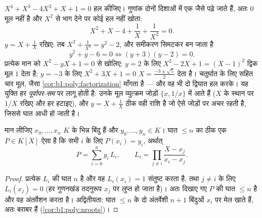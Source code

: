 \begin{example}[पूर्वापर-सम समीकरण]\label{ex:b1:poly:palindrome}
$X^4 + X^3 - 4X^2 + X + 1 = 0$ हल कीजिए। गुणांक दोनों दिशाओं में एक जैसे
पढ़े जाते हैं, अतः $0$ मूल नहीं है और $X^2$ से भाग देने पर कोई हल नहीं खोता:
\[
X^2 + X - 4 + \frac1X + \frac1{X^2} = 0 .
\]
$y = X + \frac1X$ रखिए: तब $X^2 + \frac1{X^2} = y^2 - 2$, और समीकरण सिमटकर
बन जाता है
\[
y^2 + y - 6 = 0 \iff (y + 3)(y - 2) = 0 .
\]
प्रत्येक मान को $X^2 - yX + 1 = 0$ से खोलिए: $y = 2$ के लिए $X^2 - 2X + 1 =
(X - 1)^2$ द्विक मूल $1$ देता है; $y = -3$ के लिए $X^2 + 3X + 1 = 0$ $X =
\frac{-3 \pm \sqrt5}2$ देता है। चतुर्घात के लिए  सहित चार मूल, जैसा
\cref{cor:b1:poly:factorization} माँगता है --- और वह भी दो द्विघात हल करके।
यह युक्ति हर \emph{पूर्वापर-सम}  पर लागू होती है: उनके मूल व्युत्क्रम
जोड़ों $\{x, 1/x\}$ में आते हैं ($X$ के स्थान पर $1/X$ रखिए और हर हटाइए), और
$y = X + \frac1X$ ठीक वही राशि है जो ऐसे जोड़ों पर अचर रहती है, जिससे घात
आधी हो जाती है।
\end{example}

\begin{theorem}[लाग्रांज अंतर्वेशन]\label{thm:b1:poly:lagrange}
मान लीजिए $x_0, \dots, x_n$ $K$ के भिन्न बिंदु हैं और $y_0, \dots, y_n \in
K$। घात $\leq n$ का ठीक एक $P \in K[X]$ ऐसा है कि सभी $i$ के लिए $P(x_i) =
y_i$, अर्थात्
\[
P = \sum_{i=0}^{n} y_i\, L_i,
\qquad
L_i = \prod_{j \neq i} \frac{X - x_j}{x_i - x_j} .
\]
\end{theorem}

\begin{proof}
प्रत्येक $L_i$ की घात $n$ है और वह $L_i(x_i) = 1$ संतुष्ट करता है, तथा $j
\neq i$ के लिए $L_i(x_j) = 0$ (हर गुणनखंड तदनुरूप $x_j$ पर लुप्त हो जाता
है)। अतः दिखाए गए $P$ की घात $\leq n$ है और वह अंतर्वेशन करता है।
अद्वितीयता: घात $\leq n$ के दो अंतर्वेशी  $n+1$ बिंदुओं $x_i$ पर मेल
खाते हैं, अतः बराबर हैं (\cref{cor:b1:poly:nroots})।
\end{proof}

